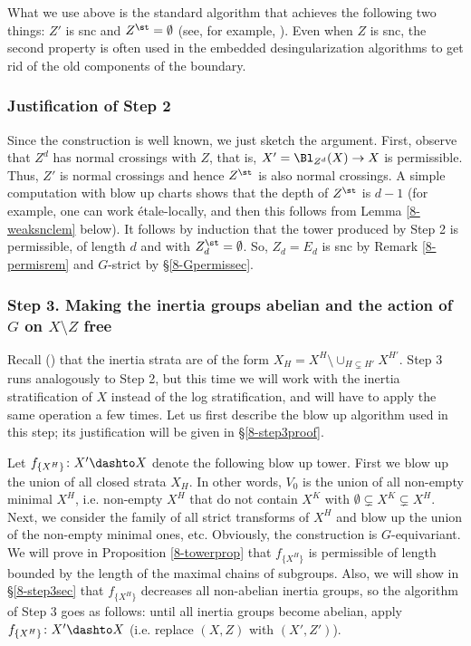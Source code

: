 \documentclass[10pt]{../fichiers-configuration-latex/smfart}
\begin{document}
\begin{remark2}\label{8-step2rem} What we use above is
the standard algorithm that achieves the following two
things: $Z'$ is snc and $Z^\st=\emptyset$ (see, for example,
\cite[7.2]{Alterations@de_Jong}). Even when $Z$ is snc, the second
property is often used in the embedded desingularization algorithms
to get rid of the old components of the boundary.  \end{remark2}

\subsubsection{Justification of Step 2}\label{8-step2proof}
Since the construction is well known, we just sketch the
argument. First, observe that $Z^d$ has normal crossings with
$Z$, that is, $X'=\Bl_{Z^d}(X)\to X$ is permissible. Thus, $Z'$
is normal crossings and hence $Z^\st$ is also normal crossings. A
simple computation with blow up charts shows that the depth of
$Z^\st$ is $d-1$ (for example, one can work \'etale-locally, and
then this follows from Lemma \ref{8-weaksnclem} below). It follows
by induction that the tower produced by Step 2 is permissible,
of length $d$ and with $Z_d^\st=\emptyset$. So, $Z_d=E_d$ is snc
by Remark \ref{8-permisrem} and $G$-strict by \S\ref{8-Gpermissec}.

\subsubsection{Step 3. Making the inertia groups abelian
and the action of $G$ on $X\setminus Z$ free}\label{8-step3}
Recall () that the inertia strata are of the
form $X_H=X^H\setminus\cup_{H\subsetneq H'}X^{H'}$. Step 3 runs
analogously to Step 2, but this time we will work with the inertia
stratification of $X$ instead of the log stratification, and will
have to apply the same operation a few times. Let us first describe
the blow up algorithm used in this step; its justification will be
given in \S\ref{8-step3proof}.

Let $f_{\{X^H\}}{\colon}X'\dashto X$ denote the following blow
up tower. First we blow up the union of all closed strata
$X_H$. In other words, $V_0$ is the union of all non-empty
minimal $X^H$, i.e. non-empty $X^H$ that do not contain $X^K$
with $\emptyset\subsetneq X^K\subsetneq X^H$. Next, we consider
the family of all strict transforms of $X^H$ and blow up the union
of the non-empty minimal ones, etc. Obviously, the construction is
$G$-equivariant. We will prove in Proposition \ref{8-towerprop} that
$f_{\{X^H\}}$ is permissible of length bounded by the length of the
maximal chains of subgroups. Also, we will show in \S\ref{8-step3sec}
that $f_{\{X^H\}}$ decreases all non-abelian inertia groups,
so the algorithm of Step 3 goes as follows: until all inertia
groups become abelian, apply $f_{\{X^H\}}{\colon}X'\dashto X$
(i.e. replace $(X,Z)$ with $(X',Z')$).
\end{document}
